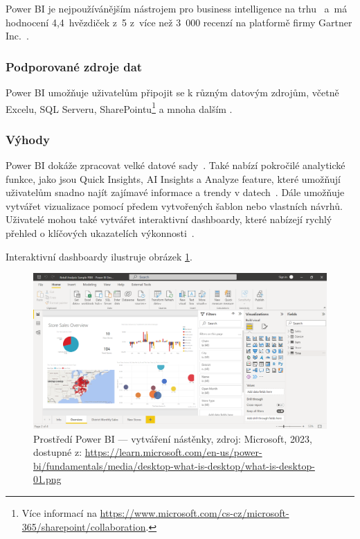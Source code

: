Power BI je nejpoužívánějším nástrojem pro business intelligence na trhu~\cite{BIMarketShares:online} a~má hodnocení 4,4~hvězdiček z~5 z~více než 3~000 recenzí na platformě firmy Gartner Inc.~\cite{PowerBIReviews:online}.

\subsubsection{Podporované zdroje dat}
Power BI umožňuje uživatelům připojit se k různým datovým zdrojům, včetně Excelu, SQL Serveru, SharePointu\footnote{Více informací na \url{https://www.microsoft.com/cs-cz/microsoft-365/sharepoint/collaboration}.} a mnoha dalším \cite{PowerBIDataSources:online}.

\subsubsection{Výhody}\label{subsubsec:PowerBITemplates}
Power BI dokáže zpracovat velké datové sady~\cite{PowerBIBigData:online}. Také nabízí pokročilé analytické funkce, jako jsou Quick Insights, AI Insights a Analyze feature, které umožňují uživatelům snadno najít zajímavé informace a trendy v datech~\cite{PowerBIInsights:online}. Dále umožňuje vytvářet vizualizace pomocí předem vytvořených šablon nebo vlastních návrhů. Uživatelé mohou také vytvářet interaktivní dashboardy, které nabízejí rychlý přehled o klíčových ukazatelích výkonnosti~\cite{PowerBIBigData:online}.

Interaktivní dashboardy ilustruje obrázek \ref{fig:PowerBIUI}. 
\nocite{WhatisPowerBI:online}
\begin{figure}
    \centering
    \includegraphics[width=0.75\linewidth]{img/PowerBIUI.png}
    \caption{Prostředí Power BI — vytváření nástěnky, zdroj: Microsoft, 2023, dostupné z: \url{https://learn.microsoft.com/en-us/power-bi/fundamentals/media/desktop-what-is-desktop/what-is-desktop-01.png} }
    \label{fig:PowerBIUI}
\end{figure}

